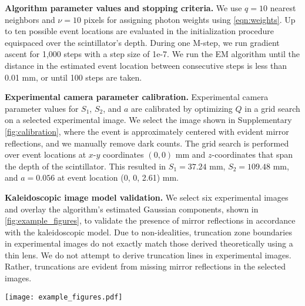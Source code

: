 \noindent
\textbf{Algorithm parameter values and stopping criteria.}
We use $q=10$ nearest neighbors and $\nu=10$ pixels for assigning photon weights 
using \cref{eqn:weights}.
Up to ten possible event locations are evaluated in the initialization procedure 
equispaced over the scintillator's depth.
During one M-step, we run gradient ascent for 1,000 steps with a step size of 1e-7.
We run the EM algorithm until the distance in the estimated event location between 
consecutive steps is less than 0.01 mm, or until 100 steps are taken.

\noindent
\textbf{Experimental camera parameter calibration.}
Experimental camera parameter values for $S_1$, $S_2$, and $a$ are calibrated by 
optimizing $Q$ in a grid search on a selected experimental image.
We select the image shown in Supplementary \cref*{fig:calibration}, where the 
event is approximately centered with evident mirror reflections, and we manually 
remove dark counts.
The grid search is performed over event locations at $x$-$y$ coordinates 
$(0,0)$ mm and $z$-coordinates that span the depth of the scintillator.
This resulted in $S_1=37.24$ mm, $S_2=109.48$ mm, and $a=0.056$ at event location 
(0, 0, 2.61) mm.

\noindent
\textbf{Kaleidoscopic image model validation.}
We select six experimental images and overlay the algorithm's estimated Gaussian 
components, shown in \cref{fig:example_figures}, to validate the presence of 
mirror reflections in accordance with the kaleidoscopic model.
Due to non-idealities, truncation zone boundaries in experimental images do not 
exactly match those derived theoretically using a thin lens.
We do not attempt to derive truncation lines in experimental images.
Rather, truncations are evident from missing mirror reflections in the selected images.

\begin{figure*}
\centering
\texttt{[image: example\_figures.pdf]}
\caption{\textbf{Selected experimental images.} Experimental images overlaid with the algorithm's estimated Gaussians.
Each dashed red circle is centered on the Gaussian component's mean. 
The inner and outer circles are one and two standard deviations in radius, respectively.
Pixels with a photon are enlarged with a $3 \times 3$ filter for visualization purposes.
} 
\label{fig:example_figures}
\end{figure*}

